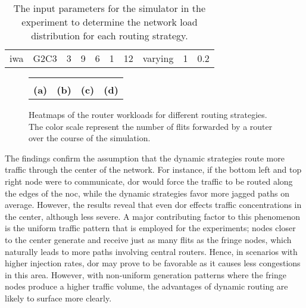 \begin{table}
    \centering
    \begin{tabulary}{\textwidth}{C|C|C|C|C|C|C|C|C|C}
        \pProtVar{} & \pNCMode{} & \pEncMods{} & \pAuthMods{} & \pRQSize{} & \pARQLimit{} & \pARQTimeout{} & \pRStrat{} & \pAttackerSet{} & \pAttackProb{} \\\hline
        \gls{iwa} & G2C3 & 3 & 9 & 6 & 1 & 12 & varying & 1 & 0.2 \\
    \end{tabulary}
    \caption[Input parameters for the router workload comparison]{The input parameters for the simulator in the experiment to determine the network load
    distribution for each routing strategy.}
    \label{tab:setuproutingheatmaps}
\end{table}

\begin{figure}
    \centering
    \begin{tabular}{cccc}
         &  &
         &  \\
        \hspace*{0.3em}\footnotesize\textbf{(a)} & \hspace*{0.3em}\footnotesize\textbf{(b)} &
        \hspace*{0.3em}\footnotesize\textbf{(c)} & \footnotesize\textbf{(d)}\hspace*{3.6em} \\
    \end{tabular}
    \caption[Heatmaps of the routers for different routing strategies]{Heatmaps of the router workloads for different routing strategies. The color
    scale represent the number of flits forwarded by a router over the course of the simulation.}
    \label{fig:resultsroutingstratheatmaps}
\end{figure}

The findings confirm the assumption that the dynamic strategies route more traffic through the center of the network. For instance, if the bottom
left and top right node were to communicate, \gls{dor} would force the traffic to be routed along the edges of the \gls{noc}, while the dynamic
strategies favor more jagged paths on average. However, the results reveal that even \gls{dor} effects traffic concentrations in the center, although
less severe. A major contributing factor to this phenomenon is the uniform traffic pattern that is employed for the experiments; nodes closer to the
center generate and receive just as many flits as the fringe nodes, which naturally leads to more paths involving central routers. Hence, in scenarios
with higher injection rates, \gls{dor} may prove to be favorable as it causes less congestions in this area. However, with non-uniform generation
patterns where the fringe nodes produce a higher traffic volume, the advantages of dynamic routing are likely to surface more clearly.

